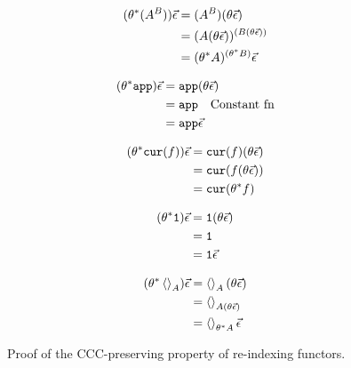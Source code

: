 \documentclass{report}
\begin{document}
\begin{figure}
\begin{framed}
            \begin{minipage}{.45\linewidth}
                \begin{align*}
                    (\theta^*(A^B))\vec{\epsilon} & = (A^B)(\theta\vec{\epsilon})\\
                     & = (A (\theta\vec{\epsilon}))^{(B (\theta\vec{\epsilon}))}\\
                     & = (\theta^* A)^{(\theta^* B)}\vec{\epsilon}\\
                \end{align*}                
            \end{minipage}
            \quad
            \begin{minipage}{.45\linewidth}
                \begin{align*}
                (\theta^* \texttt{app})\vec{\epsilon} & = \texttt{app}(\theta\vec{\epsilon})\\
                & = \texttt{app} \quad\text{Constant fn}\\
                & = \texttt{app}\vec{\epsilon}
            \end{align*}
            \end{minipage}

        \begin{minipage}{.45\linewidth}
            \begin{align*}
                (\theta^*\texttt{cur}(f))\vec{\epsilon} & = \texttt{cur}(f)(\theta\vec{\epsilon})\\
                & = \texttt{cur}(f(\theta\vec{\epsilon}))\\
                & = \texttt{cur}(\theta^* f)
            \end{align*}             
        \end{minipage}
        \quad
        \begin{minipage}{.45\linewidth}
            \begin{align*}
                (\theta^* \texttt{1})\vec{\epsilon} & = \texttt{1}(\theta\vec{\epsilon})\\
                & = \texttt{1} \\
                & = \texttt{1} \vec{\epsilon}\\
            \end{align*}
        \end{minipage}      
        
        \begin{minipage}{\linewidth}
            \begin{align*}
                (\theta^*\left\langle\right\rangle_{A})\vec{\epsilon} & = \left\langle\right\rangle_{A}(\theta\vec{\epsilon})\\
                & = \left\langle\right\rangle_{A(\theta\vec{\epsilon})}\\
                & = \left\langle\right\rangle_{\theta^* A}\vec{\epsilon}
            \end{align*}
        \end{minipage}        
    \end{framed}
    
    \caption{Proof of the CCC-preserving property of re-indexing functors.}
    \label{PreservesCCC}
\end{figure}
\end{document}
